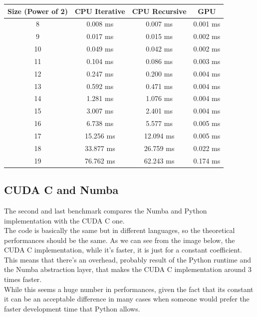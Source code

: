 \documentclass[a4paper, 12pt, oneside]{article}
\begin{document}
\begin{center}
  \begin{tabular}{ |c|c|c|c| }
    \hline
    \textbf{Size (Power of 2)} & \textbf{CPU Iterative} & \textbf{CPU Recursive} & \textbf{GPU} \\
    \hline
    8                          & 0.008 ms               & 0.007 ms               & 0.001 ms     \\
    9                          & 0.017 ms               & 0.015 ms               & 0.002 ms     \\
    10                         & 0.049 ms               & 0.042 ms               & 0.002 ms     \\
    11                         & 0.104 ms               & 0.086 ms               & 0.003 ms     \\
    12                         & 0.247 ms               & 0.200 ms               & 0.004 ms     \\
    13                         & 0.592 ms               & 0.471 ms               & 0.004 ms     \\
    14                         & 1.281 ms               & 1.076 ms               & 0.004 ms     \\
    15                         & 3.007 ms               & 2.401 ms               & 0.004 ms     \\
    16                         & 6.738 ms               & 5.577 ms               & 0.005 ms     \\
    17                         & 15.256 ms              & 12.094 ms              & 0.005 ms     \\
    18                         & 33.877 ms              & 26.759 ms              & 0.022 ms     \\
    19                         & 76.762 ms              & 62.243 ms              & 0.174 ms     \\
    \hline
  \end{tabular}
\end{center}

\subsection{CUDA C and Numba}

The second and last benchmark compares the Numba and Python implementation with the CUDA C one.\\
The code is basically the same but in different languages, so the theoretical performances should be the same.
As we can see from the image below, the CUDA C implementation, while it's faster, it is just for a constant coefficient.\\
This means that there's an overhead, probably result of the Python runtime and the Numba abstraction layer, that makes the CUDA C implementation around 3 times faster.\\
While this seems a huge number in performances, given the fact that its constant it can be an acceptable difference in many cases when someone would prefer the faster development time that Python allows.
\end{document}
